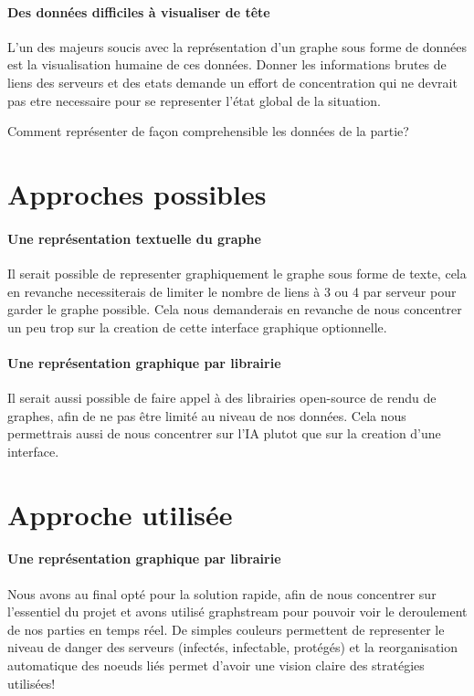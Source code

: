 \documentclass{scrreprt}
\begin{document}
    \paragraph{Des données difficiles à visualiser de tête}
    L'un des majeurs soucis avec la représentation d'un graphe sous forme de
    données est la visualisation humaine de ces données.
    Donner les informations brutes de liens des serveurs et des etats demande
    un effort de concentration qui ne devrait pas etre necessaire pour se
    representer l'état global de la situation.

    \begin{problem}
        Comment représenter de façon comprehensible les données de la partie?
    \end{problem}

    \section{Approches possibles}

    \paragraph{Une représentation textuelle du graphe}
    Il serait possible de representer graphiquement le graphe sous forme de
    texte, cela en revanche necessiterais de limiter le nombre de liens à 3
    ou 4 par serveur pour garder le graphe possible.
    Cela nous demanderais en revanche de nous concentrer un peu trop sur
    la creation de cette interface graphique optionnelle.

    \paragraph{Une représentation graphique par librairie}
    Il serait aussi possible de faire appel à des librairies open-source de
    rendu de graphes, afin de ne pas être limité au niveau de nos données.
    Cela nous permettrais aussi de nous concentrer sur l'IA plutot que sur la
    creation d'une interface.

    \section{Approche utilisée}

    \paragraph{Une représentation graphique par librairie}
    Nous avons au final opté pour la solution rapide, afin de nous concentrer
    sur l'essentiel du projet et avons utilisé graphstream pour pouvoir voir
    le deroulement de nos parties en temps réel.
    De simples couleurs permettent de representer le niveau de danger des
    serveurs (infectés, infectable, protégés) et la reorganisation
    automatique des noeuds liés permet d'avoir une vision claire des
    stratégies utilisées!
\end{document}
